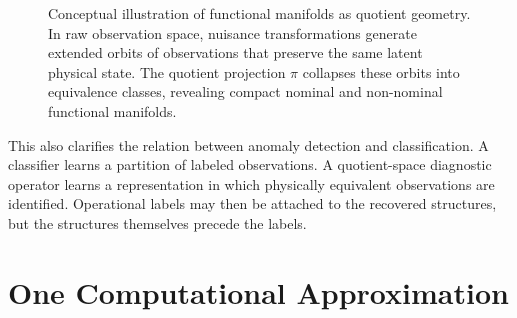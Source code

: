 \documentclass[11pt,letterpaper]{article}
\begin{document}
\begin{figure}[H]
\caption{
Conceptual illustration of functional manifolds as quotient geometry.
In raw observation space, nuisance transformations generate extended orbits of observations that preserve the same latent physical state.
The quotient projection \(\pi\) collapses these orbits into equivalence classes, revealing compact nominal and non-nominal functional manifolds.
}
\label{fig:quotient_manifold_concept}
\end{figure}

This also clarifies the relation between anomaly detection and classification.
A classifier learns a partition of labeled observations.
A quotient-space diagnostic operator learns a representation in which physically equivalent observations are identified.
Operational labels may then be attached to the recovered structures, but the structures themselves precede the labels.

\section{One Computational Approximation}
\end{document}
